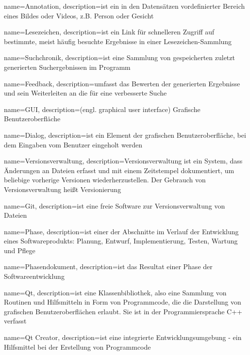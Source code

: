 {
name=Annotation,
description={ist ein in den Datensätzen vordefinierter Bereich eines Bildes oder Videos, z.B. Person oder Gesicht}
}

{
name=Lesezeichen,
description={ist ein Link für schnelleren Zugriff auf bestimmte, meist häufig besuchte Ergebnisse in einer Lesezeichen-Sammlung}
}

{
name=Suchchronik,
description={ist eine Sammlung von gespeicherten zuletzt generierten Suchergebnissen im Programm}
}

{
name=Feedback,
description={umfasst das Bewerten der generierten Ergebnisse und sein Weiterleiten an die  für eine verbesserte Suche}
}

{
name=GUI,
description={(engl. graphical user interface) Grafische Benutzeroberfläche}
}

{
name=Dialog,
description={ist ein Element der grafischen Benutzeroberfläche, bei dem Eingaben vom Benutzer eingeholt werden}
}

{
name=Versionsverwaltung,
description={Versionsverwaltung ist ein System, dass Änderungen an Dateien erfasst und mit einem Zeitstempel dokumentiert, um beliebige vorherige Versionen wiederherzustellen. Der Gebrauch von Versionsverwaltung heißt Versionierung}
}

{
name=Git,
description={ist eine freie Software zur \gls{Versionsverwaltung} von Dateien}
}

{
name=Phase,
description={ist einer der Abschnitte im Verlauf der Entwicklung eines Softwareprodukts: Planung, Entwurf, Implementierung, Testen, Wartung und Pflege}
}

{
name=Phasendokument,
description={ist das Resultat einer \gls{Phase} der Softwareentwicklung}
}

{
name=Qt,
description={ist eine Klassenbibliothek, also eine Sammlung von Routinen und Hilfsmitteln in Form von Programmcode, die die Darstellung von grafischen Benutzeroberflächen erlaubt. Sie ist in der Programmiersprache C++ verfasst}
}

{
name=Qt Creator,
description={ist eine integrierte Entwicklungsumgebung - ein Hilfsmittel bei der Erstellung von Programmcode}
}

